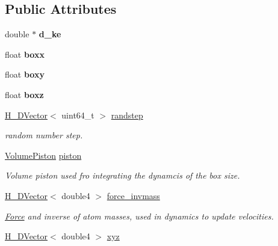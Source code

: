 \subsection*{Public Attributes}
\begin{DoxyCompactItemize}
\item 
\hypertarget{classCudaSimulationContext_ae2c8c22913ba78d5ecaa6f939653b083}{}\label{classCudaSimulationContext_ae2c8c22913ba78d5ecaa6f939653b083} 
double $\ast$ {\bfseries d\+\_\+ke}
\item 
\hypertarget{classCudaSimulationContext_a5d41f0a61d810c2dd0abde6618800d02}{}\label{classCudaSimulationContext_a5d41f0a61d810c2dd0abde6618800d02} 
float {\bfseries boxx}
\item 
\hypertarget{classCudaSimulationContext_a3a5a2667d4317775fc338a3bad244dc9}{}\label{classCudaSimulationContext_a3a5a2667d4317775fc338a3bad244dc9} 
float {\bfseries boxy}
\item 
\hypertarget{classCudaSimulationContext_a3a0b09e28d233fff25f50f4f664b12d9}{}\label{classCudaSimulationContext_a3a0b09e28d233fff25f50f4f664b12d9} 
float {\bfseries boxz}
\item 
\hyperlink{structH__DVector}{H\+\_\+\+D\+Vector}$<$ uint64\+\_\+t $>$ \hyperlink{classCudaSimulationContext_aedf3a214b43fd5155f17ae8f3ce758e8}{randstep}
\begin{DoxyCompactList}\small\item\em random number step. \end{DoxyCompactList}\item 
\hyperlink{structVolumePiston}{Volume\+Piston} \hyperlink{classCudaSimulationContext_a9077736cc7f5dae5c741a2ebe7c21767}{piston}
\begin{DoxyCompactList}\small\item\em Volume piston used fro integrating the dynamcis of the box size. \end{DoxyCompactList}\item 
\hyperlink{structH__DVector}{H\+\_\+\+D\+Vector}$<$ double4 $>$ \hyperlink{classCudaSimulationContext_a861cbb2252066e6ed93a08d3dc908443}{force\+\_\+invmass}
\begin{DoxyCompactList}\small\item\em \hyperlink{classForce}{Force} and inverse of atom masses, used in dynamics to update velocities. \end{DoxyCompactList}\item 
\hyperlink{structH__DVector}{H\+\_\+\+D\+Vector}$<$ double4 $>$ \hyperlink{classCudaSimulationContext_af7492c16a26e127e9bc11d7e30d91ba7}{xyz}

\end{DoxyCompactItemize}
